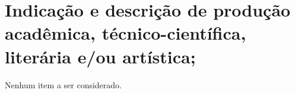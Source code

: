 \section{Indicação e descrição de produção acadêmica, técnico-científica, literária e/ou artística;}

Nenhum item a ser considerado.